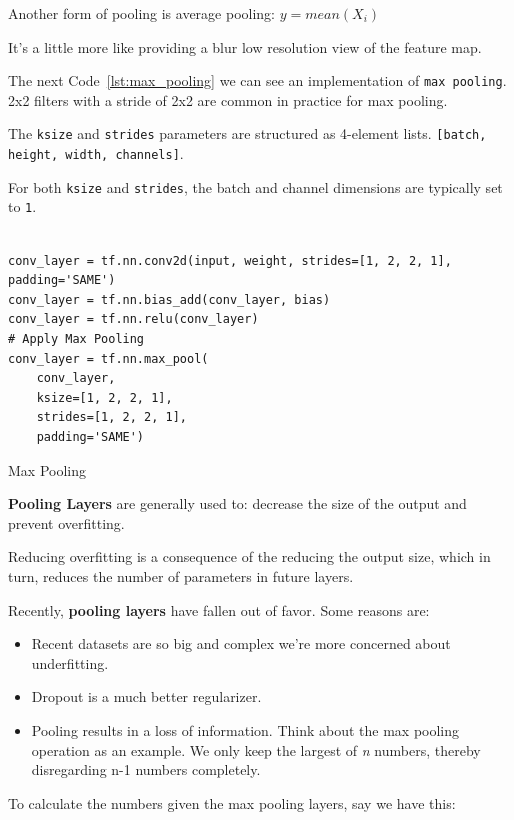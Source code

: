 \documentclass[11pt, a4paper]{article}
\begin{document}
Another form of pooling is average pooling:
$ y = mean(X_i)$

It's a little more like providing a blur low resolution view of the feature map.

The next Code~\ref{lst:max_pooling} we can see an implementation of \texttt{max pooling}. 2x2 filters with a stride of 2x2 are common in practice for max pooling.

The \texttt{ksize} and \texttt{strides} parameters are structured as 4-element lists. \texttt{[batch, height, width, channels]}.

For both \texttt{ksize} and \texttt{strides}, the batch and channel dimensions are typically set to \texttt{1}.

\begin{listing}
\begin{verbatim}

conv_layer = tf.nn.conv2d(input, weight, strides=[1, 2, 2, 1], 
padding='SAME')
conv_layer = tf.nn.bias_add(conv_layer, bias)
conv_layer = tf.nn.relu(conv_layer)
# Apply Max Pooling
conv_layer = tf.nn.max_pool(
    conv_layer,
    ksize=[1, 2, 2, 1],
    strides=[1, 2, 2, 1],
    padding='SAME')

\end{verbatim}
\caption{Max Pooling}
\label{lst:max_pooling}
\end{listing}



\textbf{Pooling Layers} are generally used to: decrease the size of the output and prevent overfitting.

Reducing overfitting is a consequence of the reducing the output size, which in turn, reduces the number of parameters in future layers.


Recently, \textbf{pooling layers} have fallen out of favor. Some reasons are:

\begin{itemize}
	\item Recent datasets are so big and complex we're more concerned about underfitting.
	\item Dropout is a much better regularizer. 
	\item Pooling results in a loss of information. Think about the max pooling operation as an example. We only keep the largest of \textit{n} numbers, thereby disregarding n-1 numbers completely.
\end{itemize}


To calculate the numbers given the max pooling layers, say we have this:
\end{document}
